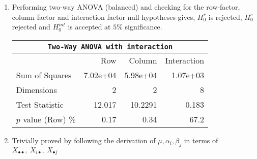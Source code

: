 \begin{enumerate}
\begin{table}[H]
		\bigskip
	\end{table}
	
	\item Performing two-way ANOVA (balanced) and checking for the row-factor, column-factor and interaction factor null hypotheses gives,
	$ H_0^r $ is rejected, $ H_0^c $ rejected and $ H_0^{int} $ is accepted at $ 5\% $ significance.

	\begin{table}[H]
		\centering
		\begin{tabular}{@{}lrrr@{}}
			\toprule
			\multicolumn{4}{c}{\texttt{Two-Way ANOVA with interaction}}\\ 
			\midrule
			{} &       Row &    Column & Interaction \\
			\midrule
			Sum of Squares     &  7.02e+04 &  5.98e+04 &    1.07e+03 \\
			Dimensions         &         2 &         2 &           8 \\
			Test Statistic     &    12.017 &   10.2291 &       0.183 \\
			$p$ value (Row) \% &      0.17 &      0.34 &        67.2 \\
			\bottomrule
		\end{tabular}
		
		\bigskip
	\end{table}

	\item Trivially proved by following the derivation of $ \mu, \alpha_i, \beta_j $ in terms of $ X_{\bullet 
	\bullet},\ X_{i \bullet},\ X_{\bullet j} $\\
\end{enumerate}

